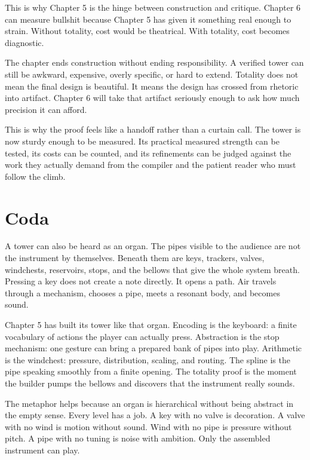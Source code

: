This is why Chapter 5 is the hinge between construction and critique. Chapter
6 can measure bullshit because Chapter 5 has given it something real enough to
strain. Without totality, cost would be theatrical. With totality, cost becomes
diagnostic.

The chapter ends construction without ending responsibility. A verified tower
can still be awkward, expensive, overly specific, or hard to extend. Totality
does not mean the final design is beautiful. It means the design has crossed
from rhetoric into artifact. Chapter 6 will take that artifact seriously enough
to ask how much precision it can afford.

This is why the proof feels like a handoff rather than a curtain call. The
tower is now sturdy enough to be measured. Its practical measured strength can be tested, its
costs can be counted, and its refinements can be judged against the work they
actually demand from the compiler and the patient reader who must follow the climb.

\section*{Coda}

A tower can also be heard as an organ. The pipes visible to the audience are
not the instrument by themselves. Beneath them are keys, trackers, valves,
windchests, reservoirs, stops, and the bellows that give the whole system
breath. Pressing a key does not create a note directly. It opens a path. Air
travels through a mechanism, chooses a pipe, meets a resonant body, and becomes
sound.

Chapter 5 has built its tower like that organ. Encoding is the keyboard: a
finite vocabulary of actions the player can actually press. Abstraction is the
stop mechanism: one gesture can bring a prepared bank of pipes into play.
Arithmetic is the windchest: pressure, distribution, scaling, and routing.
The spline is the pipe speaking smoothly from a finite opening. The totality
proof is the moment the builder pumps the bellows and discovers that the
instrument really sounds.

The metaphor helps because an organ is hierarchical without being abstract in
the empty sense. Every level has a job. A key with no valve is decoration. A
valve with no wind is motion without sound. Wind with no pipe is pressure
without pitch. A pipe with no tuning is noise with ambition. Only the assembled
instrument can play.

